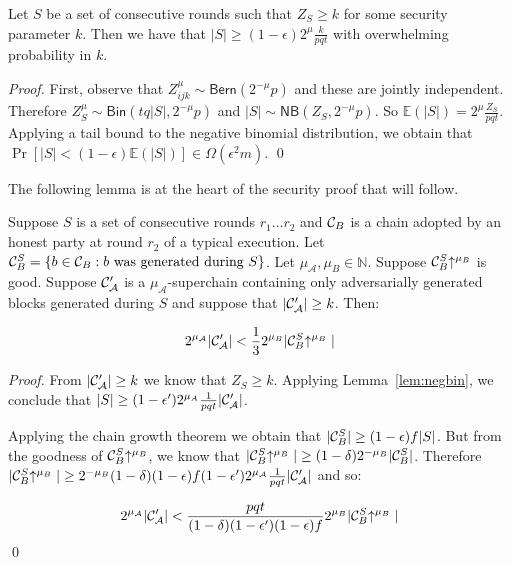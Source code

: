 
\begin{lemma}\label{lem.negbin}
    Let $S$ be a set of consecutive rounds such that $Z_S \geq k$ for some
    security parameter $k$. Then we have that $|S| \geq (1 -
    \epsilon)2^\mu\frac{k}{pqt}$ with overwhelming probability in $k$.
\end{lemma}
\begin{proof}
    First, observe that $Z_{ijk}^\mu \sim \textsf{Bern}(2^{-\mu}p)$ and these are
    jointly independent. Therefore $Z_S^\mu \sim \textsf{Bin}(tq|S|, 2^{-\mu}p)$ and
    $|S| \sim \textsf{NB}(Z_S, 2^{-\mu}p)$. So $\mathbb{E}(|S|) =
    2^\mu\frac{Z_S}{pqt}$. Applying a tail bound to the negative binomial
    distribution, we obtain that $\Pr[|S| < (1 - \epsilon)\mathbb{E}(|S|)] \in
    \Omega(\epsilon^2 m)$.
    \qed
\end{proof}

The following lemma is at the heart of the security proof that will follow.


\begin{lemma}\label{lem.level-comparison}
    Suppose $S$ is a set of consecutive rounds $r_1 \ldots r_2$
    and $\mathcal{C}_B$ is
    a chain adopted by an honest party at round $r_2$ of a typical execution.
    Let $\mathcal{C}_B^S = \{b \in
    \mathcal{C}_B: b \textnormal{ was generated during } S\}$. Let $\mu_\mathcal{A},
    \mu_B \in \mathbb{N}$. Suppose $\mathcal{C}_B^S\negthickspace\uparrow^{\mu_B}$ is good.
    Suppose $\mathcal{C}'_\mathcal{A}$ is a $\mu_\mathcal{A}$-superchain containing
    only adversarially generated blocks generated during $S$ and suppose that
    $|\mathcal{C}'_\mathcal{A}| \geq k$.
    Then:

    \begin{equation*}
    2^{\mu_\mathcal{A}}|\mathcal{C}'_\mathcal{A}| < \frac{1}{3}2^{\mu_B}|\mathcal{C}_B^S\negthickspace\uparrow^{\mu_B}|
    \end{equation*}
\end{lemma}
\begin{proof}
    From $|\mathcal{C}'_\mathcal{A}| \geq k$ we know that $Z_S \geq k$. Applying
    Lemma~\ref{lem:negbin}, we conclude that $|S| \geq (1 -
    \epsilon')2^{\mu_A}\frac{1}{pqt}|\mathcal{C}'_\mathcal{A}|$.

    Applying the chain growth theorem \cite{backbone} we obtain that $|\mathcal{C}_B^S|
    \geq (1 - \epsilon)f|S|$. But from the goodness of $\mathcal{C}_B^S\negthickspace\uparrow^{\mu_B}$, we
    know that $|\mathcal{C}_B^S\negthickspace\uparrow^{\mu_B}| \geq (1 -
    \delta)2^{-\mu_B}|\mathcal{C}_B^S|$. Therefore $|\mathcal{C}_B^S\negthickspace\uparrow^{\mu_B}| \geq
    2^{-\mu_B}(1 - \delta)(1 - \epsilon)f(1 -
    \epsilon')2^{\mu_\mathcal{A}}\frac{1}{pqt}|\mathcal{C}'_\mathcal{A}|$ and so:

    \begin{equation*}
    2^{\mu_\mathcal{A}}|\mathcal{C}'_\mathcal{A}|
    <
    \frac{pqt}{(1 - \delta)(1 -
    \epsilon')(1 - \epsilon)f}2^{\mu_B}|\mathcal{C}_B^S\negthickspace\uparrow^{\mu_B}|
    \end{equation*}
    \qed
\end{proof}

